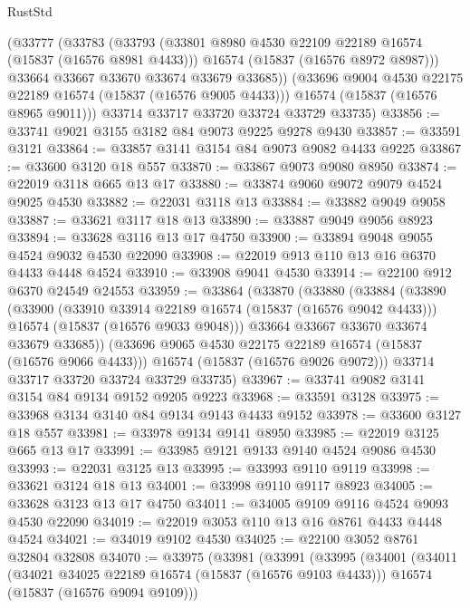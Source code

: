 \begin{lexlean}{RustStd}
\begin{coremodule}
{\begin{coremodule}
{{{{{{{{{{{{{{{{{{{{{{{{{{{{{{{{{{{{{{{{{{{{{{{{{{{{{{{{{{{{        (@33777
          (@33783
            (@33793
              (@33801 @8980 @4530 @22109 @22189 @16574 (@15837 (@16576 @8981 @4433)))
              @16574
              (@15837 (@16576 @8972 @8987)))
            @33664
            @33667
            @33670
            @33674
            @33679
            @33685))
        (@33696 @9004 @4530 @22175 @22189 @16574 (@15837 (@16576 @9005 @4433)))
        @16574
        (@15837 (@16576 @8965 @9011)))
      @33714
      @33717
      @33720
      @33724
      @33729
      @33735)
@33856 := @33741 @9021 @3155 @3182 @84 @9073 @9225 @9278 @9430
@33857 := @33591 @3121
@33864 := @33857 @3141 @3154 @84 @9073 @9082 @4433 @9225
@33867 := @33600 @3120 @18 @557
@33870 := @33867 @9073 @9080 @8950
@33874 := @22019 @3118 @665 @13 @17
@33880 := @33874 @9060 @9072 @9079 @4524 @9025 @4530
@33882 := @22031 @3118 @13
@33884 := @33882 @9049 @9058
@33887 := @33621 @3117 @18 @13
@33890 := @33887 @9049 @9056 @8923
@33894 := @33628 @3116 @13 @17 @4750
@33900 := @33894 @9048 @9055 @4524 @9032 @4530 @22090
@33908 := @22019 @913 @110 @13 @16 @6370 @4433 @4448 @4524
@33910 := @33908 @9041 @4530
@33914 := @22100 @912 @6370 @24549 @24553
@33959 := @33864
    (@33870
      (@33880
        (@33884
          (@33890
            (@33900
              (@33910 @33914 @22189 @16574 (@15837 (@16576 @9042 @4433)))
              @16574
              (@15837 (@16576 @9033 @9048)))
            @33664
            @33667
            @33670
            @33674
            @33679
            @33685))
        (@33696 @9065 @4530 @22175 @22189 @16574 (@15837 (@16576 @9066 @4433)))
        @16574
        (@15837 (@16576 @9026 @9072)))
      @33714
      @33717
      @33720
      @33724
      @33729
      @33735)
@33967 := @33741 @9082 @3141 @3154 @84 @9134 @9152 @9205 @9223
@33968 := @33591 @3128
@33975 := @33968 @3134 @3140 @84 @9134 @9143 @4433 @9152
@33978 := @33600 @3127 @18 @557
@33981 := @33978 @9134 @9141 @8950
@33985 := @22019 @3125 @665 @13 @17
@33991 := @33985 @9121 @9133 @9140 @4524 @9086 @4530
@33993 := @22031 @3125 @13
@33995 := @33993 @9110 @9119
@33998 := @33621 @3124 @18 @13
@34001 := @33998 @9110 @9117 @8923
@34005 := @33628 @3123 @13 @17 @4750
@34011 := @34005 @9109 @9116 @4524 @9093 @4530 @22090
@34019 := @22019 @3053 @110 @13 @16 @8761 @4433 @4448 @4524
@34021 := @34019 @9102 @4530
@34025 := @22100 @3052 @8761 @32804 @32808
@34070 := @33975
    (@33981
      (@33991
        (@33995
          (@34001
            (@34011
              (@34021 @34025 @22189 @16574 (@15837 (@16576 @9103 @4433)))
              @16574
              (@15837 (@16576 @9094 @9109)))
}}}}}}}}}}}}}}}}}}}}}}}}}}}}}}}}}}}}}}}}}}}}}}}}}}}}}}}}}}}}
\end{coremodule}}
\end{coremodule}
\end{lexlean}
